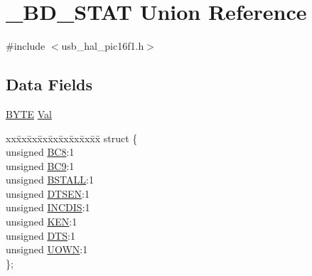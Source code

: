 \hypertarget{union___b_d___s_t_a_t}{}\section{\+\_\+\+B\+D\+\_\+\+S\+T\+A\+T Union Reference}
\label{union___b_d___s_t_a_t}


{\ttfamily \#include $<$usb\+\_\+hal\+\_\+pic16f1.\+h$>$}

\subsection*{Data Fields}
\begin{DoxyCompactItemize}
\item 
\hyperlink{_generic_type_defs_8h_a4ae1dab0fb4b072a66584546209e7d58}{B\+Y\+T\+E} \hyperlink{union___b_d___s_t_a_t_a5ab8c2bf45b20b5f7aa3a4f083896cec}{Val}
\item 
\begin{tabbing}
xx\=xx\=xx\=xx\=xx\=xx\=xx\=xx\=xx\=\kill
struct \{\\
\>unsigned \hyperlink{union___b_d___s_t_a_t_a5d5010d284e6c86702a4ce3063f4cca5}{BC8}:1\\
\>unsigned \hyperlink{union___b_d___s_t_a_t_af499c0fe1fd8eba827eb024bf69841e9}{BC9}:1\\
\>unsigned \hyperlink{union___b_d___s_t_a_t_a145ee75f12c62d2a89097d18477019f2}{BSTALL}:1\\
\>unsigned \hyperlink{union___b_d___s_t_a_t_adeff6f5de2d8ca0cfa956560288c3541}{DTSEN}:1\\
\>unsigned \hyperlink{union___b_d___s_t_a_t_a39604d4252cc3e5f9551bd2cd3b54584}{INCDIS}:1\\
\>unsigned \hyperlink{union___b_d___s_t_a_t_aaf39e9ac8929e7da9cb427f1b0de0934}{KEN}:1\\
\>unsigned \hyperlink{union___b_d___s_t_a_t_a74db087bfe32cd33c459191f7a4aeb13}{DTS}:1\\
\>unsigned \hyperlink{union___b_d___s_t_a_t_abc982c28d59f8e36dbcb06639010169d}{UOWN}:1\\
\}; \\


\end{tabbing}
\end{DoxyCompactItemize}
